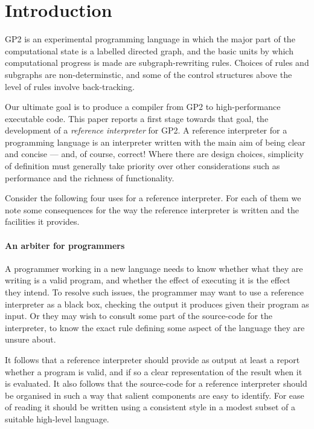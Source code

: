 \section{Introduction}

GP2 is an experimental programming language in which the major part of
the computational state is a labelled directed graph, and the basic
units by which computational progress is made are subgraph-rewriting
rules.
Choices of rules and subgraphs are non-determinstic, and some of
the control structures above the level of rules involve back-tracking.

Our ultimate goal is to produce a compiler from GP2 to
high-performance executable code.
This paper reports a first stage towards that goal, the development
of a \emph{reference interpreter} for GP2.
A reference interpreter for a programming language is
an interpreter written with the main aim of being
clear and concise --- and, of course, correct!
Where there are design choices, simplicity of
definition must generally take priority over other considerations
such as performance and the richness of functionality.

Consider the following four uses for a reference interpreter.
For each of them we note some consequences for the
way the reference interpreter is written and the
facilities it provides.

\paragraph{An arbiter for programmers}
A programmer working in a new language needs to
know whether what they are writing is a valid
program, and whether the effect of executing it
is the effect they intend.
To resolve such issues, the programmer may want to
use a reference interpreter as a black box,
checking the output it produces given their
program as input.
Or they may wish to consult some part of the
source-code for the interpreter, to know the exact
rule defining some aspect of the language they
are unsure about.

It follows that a reference interpreter should
provide as output at least a report whether a
program is valid, and if so a clear representation
of the result when it is evaluated.
It also follows that the source-code for a
reference interpreter should
be organised in such a way that salient components
are easy to identify.
For ease of reading it should be written using a
consistent style in a modest subset of a suitable
high-level language.

